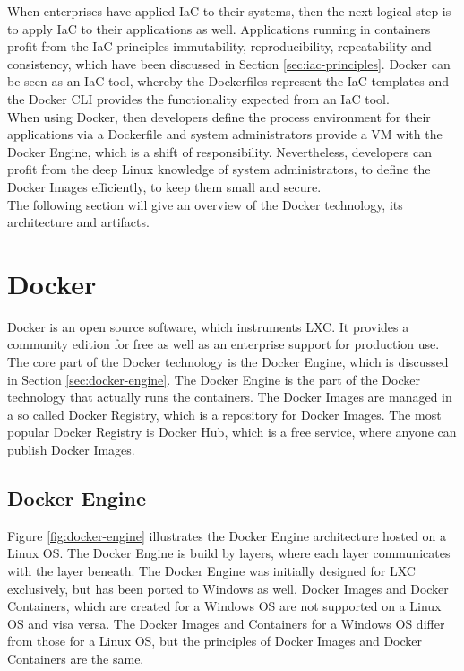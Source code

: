 When enterprises have applied IaC to their systems, then the next logical step is to apply IaC to their applications as well. Applications running in containers profit from the IaC principles immutability, reproducibility, repeatability and consistency, which have been discussed in Section \vref{sec:iac-principles}. Docker can be seen as an IaC tool, whereby the Dockerfiles represent the IaC templates and the Docker CLI provides the functionality expected from an IaC tool. \\

When using Docker, then developers define the process environment for their applications via a Dockerfile and system administrators provide a VM with the Docker Engine, which is a shift of responsibility. Nevertheless, developers can profit from the deep Linux knowledge of system administrators, to define the Docker Images efficiently, to keep them small and secure. \\

The following section will give an overview of the Docker technology, its architecture and artifacts.  

\section{Docker}
\label{sec:docker}
Docker is an open source software, which instruments LXC. It provides a community edition for free as well as an enterprise support for production use. The core part of the Docker technology is the Docker Engine, which is discussed in Section \vref{sec:docker-engine}. The Docker Engine is the part of the Docker technology that actually runs the containers. The Docker Images are managed in a so called Docker Registry, which is a repository for Docker Images. The most popular Docker Registry is Docker Hub, which is a free service, where anyone can publish Docker Images\cite{DockerRegistry2018}.

\subsection{Docker Engine}
\label{sec:docker-engine}
Figure \vref{fig:docker-engine} illustrates the Docker Engine architecture hosted on a Linux OS. The Docker Engine is build by layers, where each layer communicates with the layer beneath. The Docker Engine was initially designed for LXC exclusively, but has been ported to Windows as well. Docker Images and Docker Containers, which are created for a Windows OS are not supported on a Linux OS and visa versa. The Docker Images and Containers for a Windows OS differ from those for a Linux OS, but the principles of Docker Images and Docker Containers are the same.
\newpage

